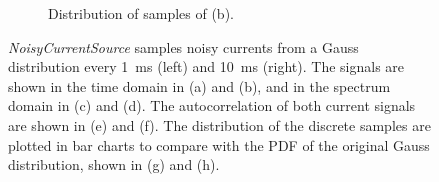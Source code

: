\begin{figure}[tbp!]
\begin{subfigure}[t]{0.43\textwidth}
			\caption{Distribution of samples of (b).}
		\end{subfigure}
		\caption{\textit{NoisyCurrentSource} samples noisy currents from a Gauss distribution every 1~ms (left) and 10~ms (right). The signals are shown in the time domain in (a) and (b), and in the spectrum domain in (c) and (d). The autocorrelation of both current signals are shown in (e) and (f). The distribution of the discrete samples are plotted in bar charts to compare with the PDF of the original Gauss distribution, shown in (g) and (h).}
		\label{Fig:lif_curr}
	\end{figure}

